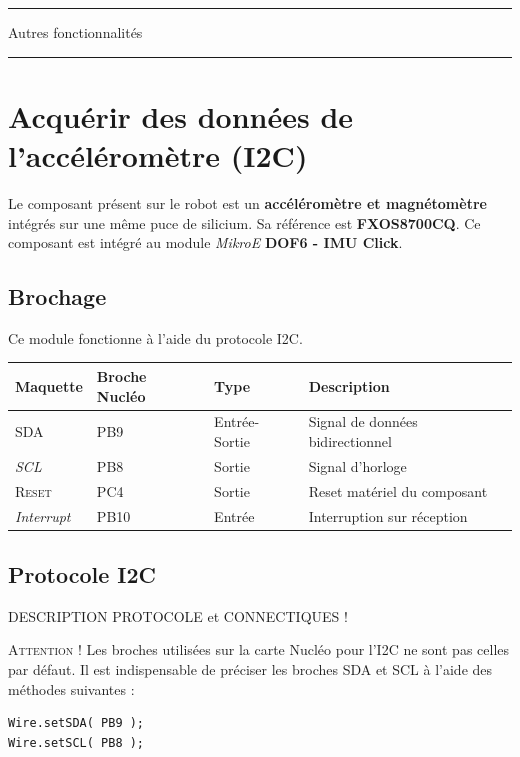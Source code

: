 \documentclass[a4paper,11pt,titlepage]{article} %
\begin{document}
\noindent \rule{\linewidth}{1pt}

{\noindent\Large \rule[-7pt]{0pt}{30pt} Autres fonctionnalités} 

\noindent \rule{\linewidth}{1pt}


\section{Acquérir des données de l'accéléromètre (I2C)}

Le composant présent sur le robot est un \textbf{accéléromètre et magnétomètre} intégrés sur une même puce de silicium. Sa référence est \textbf{FXOS8700CQ}. Ce composant est intégré au module \textit{MikroE} \textbf{DOF6 - IMU Click}.

\subsection{Brochage}

Ce module fonctionne à l'aide du protocole I2C.

\begin{center}
\begin{tabular}{|l|l|l|l|}
\hline 
Maquette & \textbf{Broche Nucléo} & Type & Description \\ 
\hline 
\textsc{SDA} & PB9 & Entrée-Sortie & Signal de données bidirectionnel \\ 
\textit{SCL} & PB8 & Sortie & Signal d'horloge\\
\hline 
\textsc{Reset} & PC4 & Sortie & Reset matériel du composant\\ 
\textit{Interrupt} & PB10 & Entrée & Interruption sur réception\\ 
\hline 
\end{tabular} 
\end{center}


\subsection{Protocole I2C}

DESCRIPTION PROTOCOLE et CONNECTIQUES !

\bigskip

\textsc{Attention !} Les broches utilisées sur la carte Nucléo pour l'I2C ne sont pas celles par défaut. Il est indispensable de préciser les broches SDA et SCL à l'aide des méthodes suivantes :

\begin{lstlisting}
Wire.setSDA( PB9 );    
Wire.setSCL( PB8 ); 
\end{lstlisting}
\end{document}
